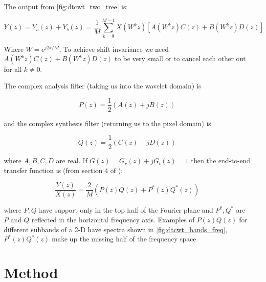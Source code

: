 The output from \autoref{fig:dtcwt_two_tree} is:

$$ Y(z) = Y_a(z) + Y_b(z) = \frac{1}{M}\sum_{k=0}^{M-1} X\left(W^k z\right)
  \left[ A\left(W^kz\right)C(z) + B\left(W^kz\right)D(z) \right] $$

Where $W=e^{j2\pi/M}$.  To achieve shift invariance we need 
$A\left(W^kz\right)C(z) + B\left(W^kz\right)D(z)$ to be very small or to cancel
each other out for all $k \neq 0$.

The complex analysis filter (taking us into the wavelet domain) is 

$$P(z) = \frac{1}{2}\left(A(z)+jB(z)\right)$$

and the complex synthesis filter (returning us to the pixel domain) is 

$$Q(z) = \frac{1}{2}\left(C(z) - jD(z)\right)$$

where $A,B,C,D$ are real.  If $G(z) = G_r(z) + jG_i(z) = 1$ then the end-to-end
transfer function is (from section 4 of \cite{kingsbury_complex_2001}):

\begin{equation}\label{eq:end_to_end1}
\frac{Y(z)}{X(z)} = \frac{2}{M}\left(P(z)Q(z) + P^*(z)Q^*(z)\right)
\end{equation}

where $P, Q$ have support only in the top half of the Fourier plane and $P^*,
Q^*$ are $P$ and $Q$ reflected in the horizontal frequency axis. Examples of
$P(z)Q(z)$ for different subbands of a 2-D \DTCWT have spectra shown in
\autoref{fig:dtcwt_bands_freq}, $P^*(z)Q^*(z)$ make up the missing half of the
frequency space.\\

\section{Method}\label{sec:method}

